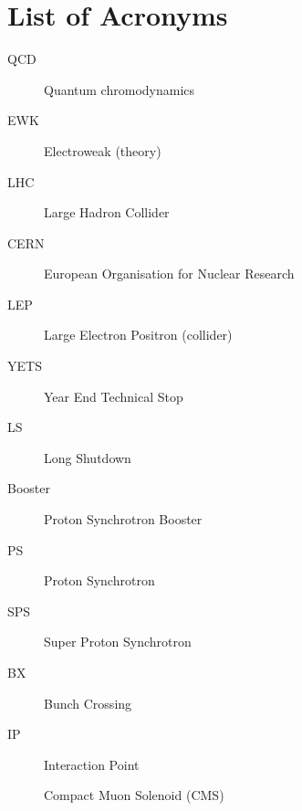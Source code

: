\chapter{List of Acronyms}
\label{chap:IV-1-acronyms}

  \begin{description}

    \item[QCD]		    \dotfill	Quantum chromodynamics
    \item[EWK]		    \dotfill	Electroweak (theory)

    \item[LHC]		    \dotfill	Large Hadron Collider
    \item[CERN]       \dotfill	European Organisation for Nuclear Research
    \item[LEP]        \dotfill  Large Electron Positron (collider)
    \item[YETS]       \dotfill  Year End Technical Stop
    \item[LS]         \dotfill  Long Shutdown
    \item[Booster]    \dotfill  Proton Synchrotron Booster
    \item[PS]         \dotfill  Proton Synchrotron
    \item[SPS]        \dotfill  Super Proton Synchrotron
    \item[BX]         \dotfill  Bunch Crossing
    \item[IP]         \dotfill  Interaction Point

    Compact Muon Solenoid (CMS)

  \end{description}
